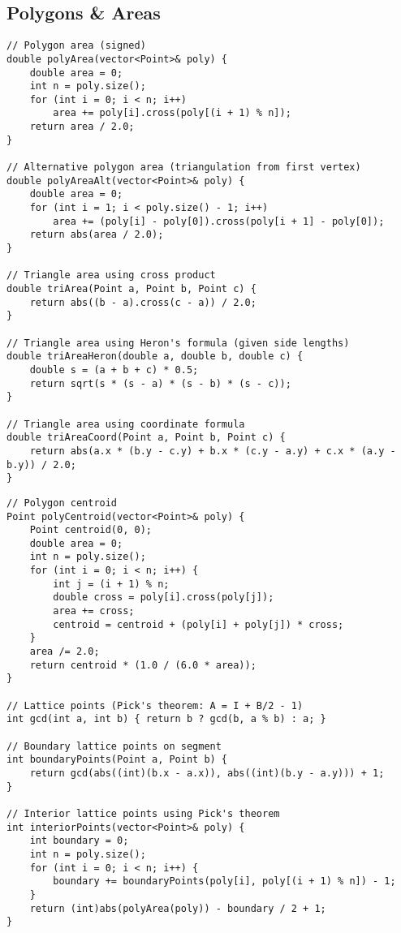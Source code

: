 \documentclass[11pt,a4paper]{article}
\begin{document}
\newpage

\subsection{Polygons \& Areas}
\begin{lstlisting}[caption={Polygon Area Calculations}]
// Polygon area (signed)
double polyArea(vector<Point>& poly) {
    double area = 0;
    int n = poly.size();
    for (int i = 0; i < n; i++)
        area += poly[i].cross(poly[(i + 1) % n]);
    return area / 2.0;
}

// Alternative polygon area (triangulation from first vertex)
double polyAreaAlt(vector<Point>& poly) {
    double area = 0;
    for (int i = 1; i < poly.size() - 1; i++)
        area += (poly[i] - poly[0]).cross(poly[i + 1] - poly[0]);
    return abs(area / 2.0);
}

// Triangle area using cross product
double triArea(Point a, Point b, Point c) {
    return abs((b - a).cross(c - a)) / 2.0;
}

// Triangle area using Heron's formula (given side lengths)
double triAreaHeron(double a, double b, double c) {
    double s = (a + b + c) * 0.5;
    return sqrt(s * (s - a) * (s - b) * (s - c));
}

// Triangle area using coordinate formula
double triAreaCoord(Point a, Point b, Point c) {
    return abs(a.x * (b.y - c.y) + b.x * (c.y - a.y) + c.x * (a.y - b.y)) / 2.0;
}
\end{lstlisting}

\newpage

\begin{lstlisting}[caption={Polygon Centroid and Lattice Points}]
// Polygon centroid
Point polyCentroid(vector<Point>& poly) {
    Point centroid(0, 0);
    double area = 0;
    int n = poly.size();
    for (int i = 0; i < n; i++) {
        int j = (i + 1) % n;
        double cross = poly[i].cross(poly[j]);
        area += cross;
        centroid = centroid + (poly[i] + poly[j]) * cross;
    }
    area /= 2.0;
    return centroid * (1.0 / (6.0 * area));
}

// Lattice points (Pick's theorem: A = I + B/2 - 1)
int gcd(int a, int b) { return b ? gcd(b, a % b) : a; }

// Boundary lattice points on segment
int boundaryPoints(Point a, Point b) {
    return gcd(abs((int)(b.x - a.x)), abs((int)(b.y - a.y))) + 1;
}

// Interior lattice points using Pick's theorem
int interiorPoints(vector<Point>& poly) {
    int boundary = 0;
    int n = poly.size();
    for (int i = 0; i < n; i++) {
        boundary += boundaryPoints(poly[i], poly[(i + 1) % n]) - 1;
    }
    return (int)abs(polyArea(poly)) - boundary / 2 + 1;
}
\end{lstlisting}
\end{document}

